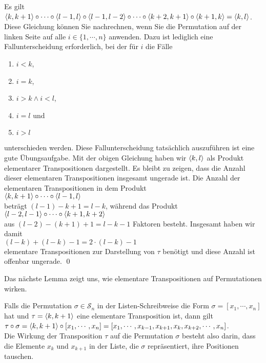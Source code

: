 \proof
Es gilt 
\\[0.2cm]
\hspace*{1.3cm}
$\pair(k,k+1) \circ \cdots \circ \pair(l-1,l) \circ \pair(l-1,l-2) \circ \cdots \circ \pair(k+2,k+1)\circ \pair(k+1,k) = \pair(k,l)$.  
\\[0.2cm]
Diese Gleichung k\"onnen Sie nachrechnen, wenn Sie die Permutation auf der linken Seite
auf alle $i \in \{1,\cdots,n\}$ anwenden.  Dazu ist lediglich eine Fallunterscheidung erforderlich,
bei der f\"ur $i$ die F\"alle
\begin{enumerate}
\item $i < k$,
\item $i = k$,
\item $i > k \wedge i < l$,
\item $i = l$ und
\item $i > l$
\end{enumerate}
unterschieden werden.  Diese Fallunterscheidung tats\"achlich auszuf\"uhren ist eine gute \"Ubungsaufgabe.
Mit der obigen Gleichung haben wir $\pair(k,l)$ als Produkt elementarer Transpositionen dargestellt. 
Es bleibt zu zeigen, dass die Anzahl dieser elementaren Transpositionen insgesamt ungerade ist.  Die Anzahl der
elementaren Transpositionen in dem Produkt
\\[0.2cm]
\hspace*{1.3cm}
$\pair(k,k+1) \circ \cdots \circ \pair(l-1,l)$
\\[0.2cm]
betr\"agt $(l - 1) - k + 1 = l - k$, w\"ahrend das Produkt
\\[0.2cm]
\hspace*{1.3cm}
$\pair(l-2,l-1) \circ \cdots \circ \pair(k+1,k+2)$
\\[0.2cm]
aus $(l-2) - (k+1) + 1 = l - k -1$ Faktoren besteht. 
Insgesamt haben wir damit
\\[0.2cm]
\hspace*{1.3cm}
 $(l - k) + (l - k) - 1 = 2 \cdot (l-k) -1$ 
\\[0.2cm]
elementare Transpositionen zur
Darstellung von $\tau$ ben\"otigt und diese Anzahl ist offenbar ungerade.
\qed

Das n\"achste Lemma zeigt uns, wie elementare Transpositionen auf Permutationen wirken.

\begin{Lemma}
  Falls die Permutation $\sigma \in \mathcal{S}_n$ in der Listen-Schreibweise die Form $\sigma = [x_1,\cdots,x_n]$ hat 
  und $\tau = \pair(k, k+1)$ eine elementare Transposition ist, dann gilt
  \\[0.2cm]
  \hspace*{1.3cm}
  $\tau \circ \sigma = \pair(k,k+1) \circ [x_1,\cdots,x_n] = [x_1, \cdots, x_{k-1},x_{k+1}, x_k,x_{k+2},\cdots, x_n]$.
  \\[0.2cm]
  Die Wirkung der Transposition $\tau$ auf die Permutation $\sigma$ besteht also darin, dass die Elemente
  $x_k$ und $x_{k+1}$ in der Liste, die $\sigma$ repr\"asentiert, ihre Positionen tauschen.
\end{Lemma}

